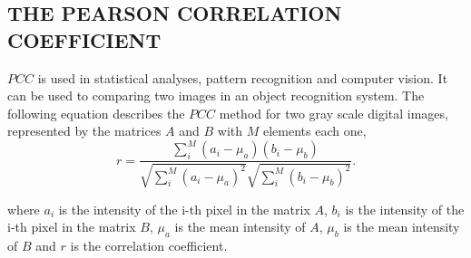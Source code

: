 
\subsection{THE PEARSON CORRELATION COEFFICIENT}

$PCC$ is used in statistical analyses, pattern recognition and computer vision. 
It can be used to comparing two images in an object recognition system. 
The following equation describes the $PCC$ method for two gray scale digital images\cite{Eugene},
represented by the matrices $A$ and $B$ with $M$ elements each one,
\begin{equation}
r = \frac{\sum \limits_{i}^{M} (a_i-\mu_a)(b_i-\mu_b)}{\sqrt{\sum \limits_{i}^{M} (a_i-\mu_a)^2} \sqrt{\sum\limits_{i}^{M} (b_i-\mu_b)^2}}.
\end{equation}

where $a_i$ is the intensity of the i-th pixel in the  matrix $A$, 
$b_i$ is the intensity of the i-th pixel in the matrix $B$, 
$\mu_a$ is the mean intensity of $A$,
$\mu_b$ is the mean intensity of $B$ and
$r$ is the correlation coefficient\cite{Miranda Neto}.
